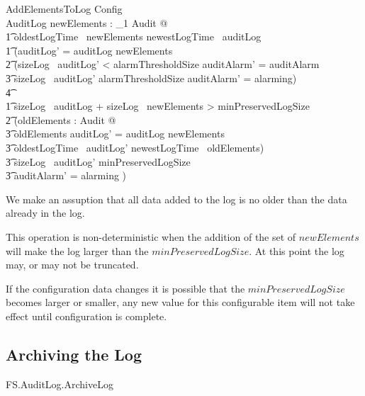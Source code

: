 \begin{schema}{AddElementsToLog}
        Config
\\      \Delta AuditLog
\where
        \exists newElements : \finset_1 Audit @
\\ \t1        oldestLogTime~ newElements \geq newestLogTime~ auditLog
\also
\\ \t1 \land  (auditLog' = auditLog \cup newElements
\\ \t2  \land (sizeLog~ auditLog' < alarmThresholdSize \land
auditAlarm' = auditAlarm   
\\ \t3  \lor  sizeLog~ auditLog' \geq alarmThresholdSize \land
auditAlarm' = alarming)
\\ \t4  \lor
\\ \t1    sizeLog~ auditLog + sizeLog~ newElements > minPreservedLogSize 
\\ \t2  \land (\exists oldElements : \finset Audit  @ 
\\ \t3  oldElements \cup auditLog' = auditLog \cup newElements 
\\ \t3  \land oldestLogTime~ auditLog' \geq newestLogTime~ oldElements)
\\ \t3  \land sizeLog~ auditLog' \geq minPreservedLogSize
\\ \t3  \land auditAlarm' = alarming  )            
\end{schema}
\begin{Zcomment}
\item
We make an assuption that all data added to the log is no older than
the data already in the log. 
\item
This operation is non-deterministic when the addition of the set of
$newElements$ will make the log larger than the
$minPreservedLogSize$. At this point the log may, or may not be
truncated.
\item
If the configuration data changes it is possible that the $minPreservedLogSize$
becomes larger or smaller, any new value for this configurable item
will not take effect until configuration is complete.
\end{Zcomment}

\subsection{Archiving the Log}

\begin{traceunit}{FS.AuditLog.ArchiveLog}
\end{traceunit}

